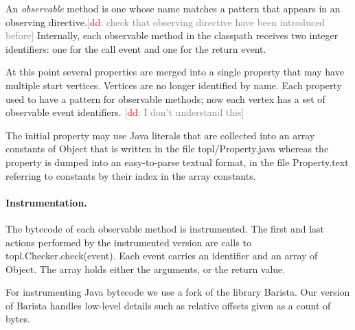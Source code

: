 \documentclass{sigplanconf}[10pt] %
\newcommand{\noterg}[2]{\textcolor{gray}{[\textcolor{red}{#1}: #2]}}
\newcommand{\dd}[1]{\noterg{dd}{#1}}
\newcommand{\dinocomment}[1]{\dd{#1}}
\begin{document}
An \emph{observable} method is one whose name matches a pattern that appears in an \textsf{observing} directive.\dinocomment{check that observing directive have been introduced before}
Internally, each observable method in the classpath receives two integer identifiers: one for the call event and one for the return event.

At this point several properties are merged into a single property that may have multiple start vertices.
Vertices are no longer identified by name.
Each property used to have a pattern for observable methods;
now each vertex has a set of observable event identifiers.
\dinocomment{I don't understand this}

The initial property may use Java literals that are collected 
 into an array \textsf{constants} of \textsf{Object} that is written in the file \textsf{topl/Property.java}  whereas
the property is dumped into an easy-to-parse textual format, in the file \textsf{Property.text} 
referring to constants by their index in the array \textsf{constants}.

%

\paragraph{Instrumentation.}
The bytecode of each observable method is instrumented.
The first and last actions performed by the instrumented version are calls to {\sf topl.Checker.check(event)}.
Each \textsf{event} carries an identifier and an array of \textsf{Object}.
The array holds either the arguments, or the return value.

For instrumenting Java bytecode we use a fork of the library Barista.
Our version of Barista handles low-level details such as relative offsets given as a count of bytes.
\end{document}
